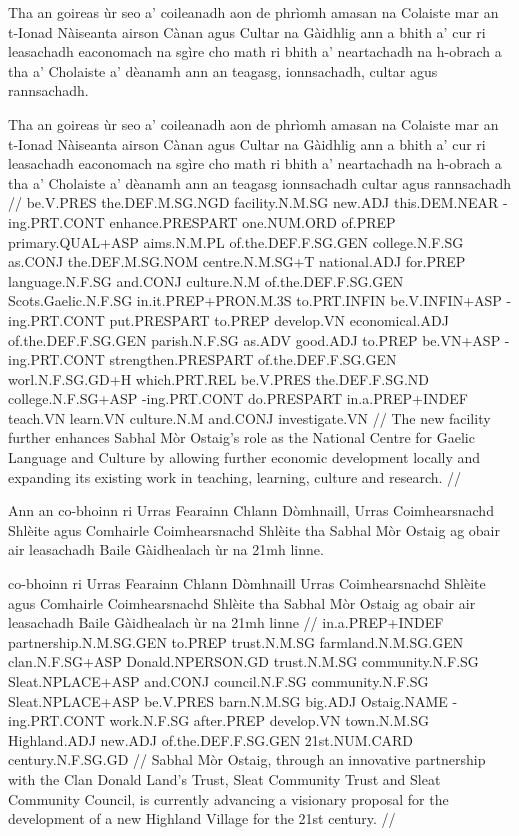 \documentclass[a4paper,10pt]{article}
\begin{document}
\ex
\begingl
\glpre Tha an goireas ùr seo a' coileanadh aon de phrìomh amasan na Colaiste mar an t-Ionad Nàiseanta airson Cànan agus Cultar na Gàidhlig ann a bhith a' cur ri leasachadh eaconomach na sgìre cho math ri bhith a' neartachadh na h-obrach a tha a' Cholaiste a' dèanamh ann an teagasg, ionnsachadh, cultar agus rannsachadh. 

\vspace{4mm}
\gla Tha an goireas ùr seo a' coileanadh aon de phrìomh amasan na Colaiste mar an t-Ionad Nàiseanta airson Cànan agus Cultar na Gàidhlig ann a bhith a' cur ri leasachadh eaconomach na sgìre cho math ri bhith a' neartachadh na h-obrach a tha a' Cholaiste a' dèanamh {ann an} teagasg ionnsachadh cultar agus rannsachadh  //
\glb be.V.PRES the.DEF.M.SG.NGD facility.N.M.SG new.ADJ this.DEM.NEAR -ing.PRT.CONT enhance.PRESPART one.NUM.ORD of.PREP primary.QUAL+ASP aims.N.M.PL of.the.DEF.F.SG.GEN college.N.F.SG as.CONJ the.DEF.M.SG.NOM centre.N.M.SG+T national.ADJ for.PREP language.N.F.SG and.CONJ culture.N.M of.the.DEF.F.SG.GEN Scots.Gaelic.N.F.SG in.it.PREP+PRON.M.3S to.PRT.INFIN be.V.INFIN+ASP -ing.PRT.CONT put.PRESPART to.PREP develop.VN economical.ADJ of.the.DEF.F.SG.GEN parish.N.F.SG as.ADV good.ADJ to.PREP be.VN+ASP -ing.PRT.CONT strengthen.PRESPART of.the.DEF.F.SG.GEN worl.N.F.SG.GD+H which.PRT.REL be.V.PRES the.DEF.F.SG.ND college.N.F.SG+ASP -ing.PRT.CONT do.PRESPART in.a.PREP+INDEF teach.VN learn.VN culture.N.M and.CONJ investigate.VN  //
\glft The new facility further enhances Sabhal Mòr Ostaig's role as the National Centre for Gaelic Language and Culture by allowing further economic development locally and expanding its existing work in teaching, learning, culture and research. //
\endgl
\xe

\ex
\begingl
\glpre Ann an co-bhoinn ri Urras Fearainn Chlann Dòmhnaill, Urras Coimhearsnachd Shlèite agus Comhairle Coimhearsnachd Shlèite tha Sabhal Mòr Ostaig ag obair air leasachadh Baile Gàidhealach ùr na 21mh linne. 

\vspace{4mm}
 co-bhoinn ri Urras Fearainn Chlann Dòmhnaill Urras Coimhearsnachd Shlèite agus Comhairle Coimhearsnachd Shlèite tha Sabhal Mòr Ostaig ag obair air leasachadh Baile Gàidhealach ùr na 21mh linne  //
\glb in.a.PREP+INDEF partnership.N.M.SG.GEN to.PREP trust.N.M.SG farmland.N.M.SG.GEN clan.N.F.SG+ASP Donald.NPERSON.GD trust.N.M.SG community.N.F.SG Sleat.NPLACE+ASP and.CONJ council.N.F.SG community.N.F.SG Sleat.NPLACE+ASP be.V.PRES barn.N.M.SG big.ADJ Ostaig.NAME -ing.PRT.CONT work.N.F.SG after.PREP develop.VN town.N.M.SG Highland.ADJ new.ADJ of.the.DEF.F.SG.GEN 21st.NUM.CARD century.N.F.SG.GD  //
\glft Sabhal Mòr Ostaig, through an innovative partnership with the Clan Donald Land's Trust, Sleat Community Trust and Sleat Community Council, is currently advancing a visionary proposal for the development of a new Highland Village for the 21st century. //
\endgl
\xe
\end{document}
